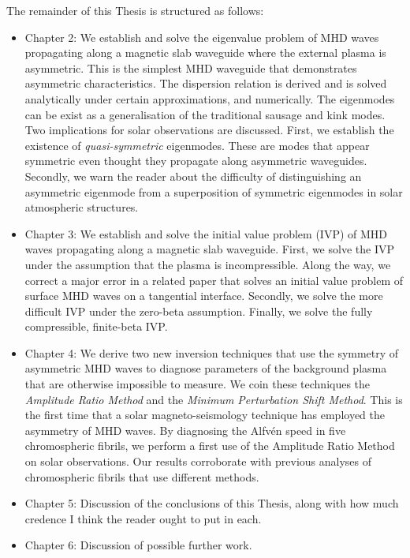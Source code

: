 \documentclass[12pt]{../style-files/ociamthesis}
\begin{document}
The remainder of this Thesis is structured as follows:
\begin{itemize}
	\item Chapter 2: We establish and solve the eigenvalue problem of MHD waves propagating along a magnetic slab waveguide where the external plasma is asymmetric. This is the simplest MHD waveguide that demonstrates asymmetric characteristics. The dispersion relation is derived and is solved analytically under certain approximations, and numerically. The eigenmodes can be exist as a generalisation of the traditional sausage and kink modes. Two implications for solar observations are discussed. First, we establish the existence of \textit{quasi-symmetric} eigenmodes. These are modes that appear symmetric even thought they propagate along asymmetric waveguides. Secondly, we warn the reader about the difficulty of distinguishing an asymmetric eigenmode from a superposition of symmetric eigenmodes in solar atmospheric structures.
	\item Chapter 3: We establish and solve the initial value problem (IVP) of MHD waves propagating along a magnetic slab waveguide. First, we solve the IVP under the assumption that the plasma is incompressible. Along the way, we correct a major error in a related paper that solves an initial value problem of surface MHD waves on a tangential interface. Secondly, we solve the more difficult IVP under the zero-beta assumption. Finally, we solve the fully compressible, finite-beta IVP.
	\item Chapter 4: We derive two new inversion techniques that use the symmetry of asymmetric MHD waves to diagnose parameters of the background plasma that are otherwise impossible to measure. We coin these techniques the \textit{Amplitude Ratio Method} and the \textit{Minimum Perturbation Shift Method}. This is the first time that a solar magneto-seismology technique has employed the asymmetry of MHD waves. By diagnosing the Alfv\'{e}n speed in five chromospheric fibrils, we perform a first use of the Amplitude Ratio Method on solar observations. Our results corroborate with previous analyses of chromospheric fibrils that use different methods.
	\item Chapter 5: Discussion of the conclusions of this Thesis, along with how much credence I think the reader ought to put in each.
	\item Chapter 6: Discussion of possible further work.
\end{itemize}



  
\end{document}
